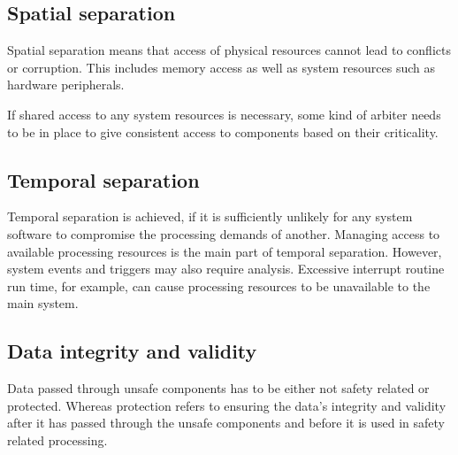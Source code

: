 \subsection{Spatial separation}

Spatial separation means that access of physical resources cannot lead to conflicts or corruption. This includes memory access as well as system resources such as hardware peripherals. 

If shared access to any system resources is necessary, some kind of arbiter needs to be in place to give consistent access to components based on their criticality. 
\subsection{Temporal separation}
Temporal separation is achieved, if it is sufficiently unlikely for any system software to compromise the processing demands of another.
Managing access to available processing resources is the main part of temporal separation. However, system events and triggers may also require analysis. Excessive interrupt routine run time, for example, can cause processing resources to be unavailable to the main system. 
\subsection{Data integrity and validity}
Data passed through unsafe components has to be either not safety related or protected. Whereas protection refers to ensuring the data's integrity and validity after it has passed through the unsafe components and before it is used in safety related processing.

